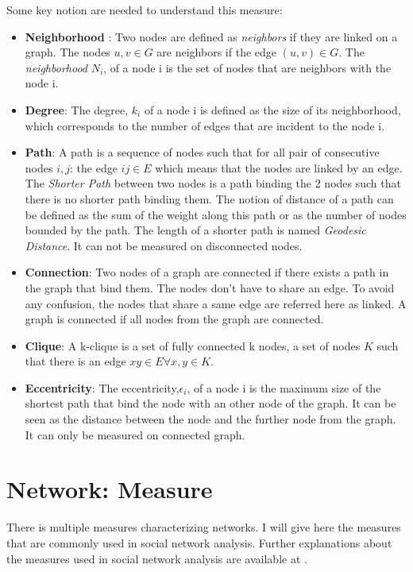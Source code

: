 \documentclass[a4paper, 12pt]{report}
\begin{document}
Some key notion are needed to understand this measure:
\begin{itemize}
\item \textbf{Neighborhood} : Two nodes are defined as \textit{neighbors} if they are linked on a graph. The nodes $u,v \in G$ are neighbors if the edge $(u,v) \in G$. The \textit{neighborhood} $N_i$, of a node i is the set of nodes that are neighbors with the node i.

\item \textbf{Degree}: The degree, $k_i$ of a node i is defined as the size of its neighborhood, which corresponds to the number of edges that are incident to the node i.


\item \textbf{Path}: A path is a sequence of nodes such that for all pair of consecutive nodes $i,j$: the edge $ij \in E$ which means that the nodes are linked by an edge. The \textit{Shorter Path} between two nodes is a path binding the 2 nodes such that there is no shorter path binding them. The notion of distance of a path can be defined as the sum of the weight along this path or as the number of nodes bounded by the path. The length of a shorter path is named \textit{Geodesic Distance}. It can not be measured on disconnected nodes.

\item \textbf{Connection}: Two nodes of a graph are connected if there exists a path in the graph that bind them. The nodes don't have to share an edge. To avoid any confusion, the nodes that share a same edge are referred here as linked. A graph is connected if all nodes from the graph are connected.

\item \textbf{Clique}: A k-clique is a set of fully connected k nodes, a set of nodes $K$ such that there is an edge $xy \in E \forall x,y \in K $. 

\item \textbf{Eccentricity}:  The eccentricity,$\epsilon_i$, of a node i is the maximum size of the shortest path that bind the node with an other node of the graph. It can be seen as the distance between the node and the further node from the graph. It  can only be measured on connected graph.

\end{itemize}	
\citep{diestel}
\section{Network: Measure}
\label{measure}
There is multiple measures characterizing  networks. I will give here the measures that are commonly used in social network analysis. Further explanations about the measures used in social network analysis are available at \cite{SNA_Overview}.
\end{document}
